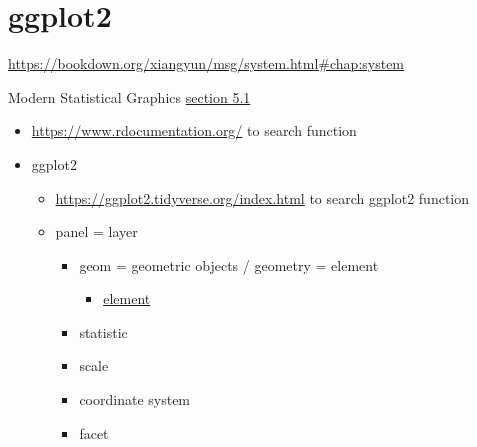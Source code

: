 \documentclass[
]{book}
\providecommand{\tightlist}{%
  \setlength{\itemsep}{0pt}\setlength{\parskip}{0pt}}
\theoremstyle{definition}
\theoremstyle{definition}
\theoremstyle{definition}
\theoremstyle{definition}
\theoremstyle{remark}
\begin{document}
\chapter{ggplot2}\label{ggplot2}

\url{https://bookdown.org/xiangyun/msg/system.html\#chap:system}

Modern Statistical Graphics \href{https://bookdown.org/xiangyun/msg/system.html\#sec:ggplot2}{section 5.1}

\begin{itemize}
\tightlist
\item
  \url{https://www.rdocumentation.org/} to search function
\item
  ggplot2

  \begin{itemize}
  \tightlist
  \item
    \url{https://ggplot2.tidyverse.org/index.html} to search ggplot2 function
  \item
    panel = layer

    \begin{itemize}
    \tightlist
    \item
      geom = geometric objects / geometry = element

      \begin{itemize}
      \tightlist
      \item
        \href{https://bookdown.org/xiangyun/msg/elements.html\#cha:elements}{element}
      \end{itemize}
    \item
      statistic
    \item
      scale
    \item
      coordinate system
    \item
      facet
    \end{itemize}
  \end{itemize}
\end{itemize}
\end{document}
